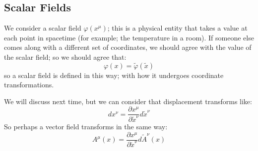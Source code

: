 \subsection{Scalar Fields}
We consider a scalar field $\varphi(x^\mu)$; this is a physical entity that takes a value at each point in spacetime (for example; the temperature in a room). If someone else comes along with a different set of coordinates, we should agree with the value of the scalar field; so we should agree that:
\begin{equation}
    \varphi(x) = \tilde{\varphi}(\tilde{x})
\end{equation}
so a scalar field is defined in this way; with how it undergoes coordinate transformations.

We will discuss next time, but we can consider that displacement transforms like:
\begin{equation}
    dx^\nu = \frac{\partial x^\mu}{\partial \tilde{x}^\nu}d\tilde{x}^\nu
\end{equation}
So perhaps a vector field transforms in the same way:
\begin{equation}
    A^\mu(x) = \frac{\partial x^\mu}{\partial \tilde{x}^\nu} d\tilde{A}^\nu(x)
\end{equation}